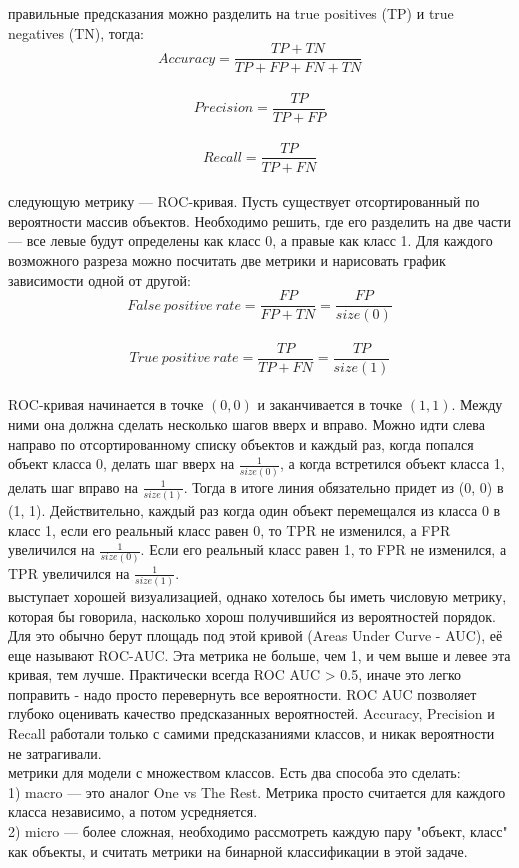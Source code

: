 \documentclass{article}
\newcommand\tab[1][1cm]{\hspace*{#1}}
\begin{document}
 правильные предсказания можно разделить на true positives (TP) и true negatives (TN), тогда:\\
$$Accuracy = \frac{TP+TN}{TP+FP+FN+TN}$$\\
$$Precision = \frac{TP}{TP+FP}$$\\
$$Recall =\frac{TP}{TP+FN}$$\\
 следующую метрику — ROC-кривая. Пусть существует отсортированный по вероятности массив объектов. Необходимо решить, где его разделить на две части — все левые будут определены как класс 0, а правые как класс 1. Для каждого возможного разреза можно посчитать две метрики и нарисовать график зависимости одной от другой:\\
$$False\:positive\:rate = \frac{FP}{FP + TN} = \frac{FP}{size(0)}$$\\
$$True\:positive\:rate = \frac{TP}{TP + FN} = \frac{TP}{size(1)}$$\\
\tab ROC-кривая начинается в точке $(0, 0)$ и заканчивается в точке $(1, 1)$. Между ними она должна сделать несколько шагов вверх и вправо. Можно идти слева направо по отсортированному списку объектов и каждый раз, когда попался объект класса 0, делать шаг вверх на $\frac{1}{size(0)}$, а когда встретился объект класса 1, делать шаг вправо на $\frac{1}{size(1)}$. Тогда в итоге линия обязательно придет из (0, 0) в (1, 1). Действительно, каждый раз когда один объект перемещался из класса 0 в класс 1, если его реальный класс равен 0, то TPR не изменился, а FPR увеличился на $\frac{1}{size(0)}$. Если его реальный класс равен 1, то FPR не изменился, а TPR увеличился на $\frac{1}{size(1)}$.\\
 выступает хорошей визуализацией, однако хотелось бы иметь числовую метрику, которая бы говорила, насколько хорош получившийся из вероятностей порядок. Для это обычно берут площадь под этой кривой (Areas Under Curve - AUC), её еще называют ROC-AUC. Эта метрика не больше, чем 1, и чем выше и левее эта кривая, тем лучше. Практически всегда ROC AUC > 0.5, иначе это легко поправить - надо просто перевернуть все вероятности. ROC AUC позволяет глубоко оценивать качество предсказанных вероятностей. Accuracy, Precision и Recall работали только с самими предсказаниями классов, и никак вероятности не затрагивали.\\
 метрики для модели с множеством классов. Есть два способа это сделать:\\
\tab1) macro — это аналог One vs The Rest. Метрика просто считается для каждого класса независимо, а потом усредняется.\\
\tab2) micro — более сложная, необходимо рассмотреть каждую пару "объект, класс" как объекты, и считать метрики на бинарной классификации в этой задаче.
\newpage
\end{document}

